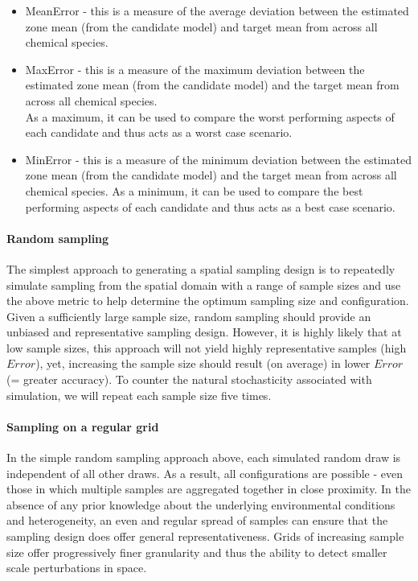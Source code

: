 \documentclass[a4paper]{article}
\begin{document}
\begin{itemize}
\tightlist
\item
  MeanError - this is a measure of the average deviation between the
  estimated zone mean (from the candidate model) and target mean from
  across all chemical species.
\item
  MaxError - this is a measure of the maximum deviation between the
  estimated zone mean (from the candidate model) and the target mean
  from across all chemical species.\\
  As a maximum, it can be used to compare the worst performing aspects
  of each candidate and thus acts as a worst case scenario.
\item
  MinError - this is a measure of the minimum deviation between the
  estimated zone mean (from the candidate model) and the target mean
  from across all chemical species. As a minimum, it can be used to
  compare the best performing aspects of each candidate and thus acts as
  a best case scenario.
\end{itemize}

\hypertarget{random-sampling}{%
\paragraph{Random sampling}\label{random-sampling}}

The simplest approach to generating a spatial sampling design is to
repeatedly simulate sampling from the spatial domain with a range of
sample sizes and use the above metric to help determine the optimum
sampling size and configuration. Given a sufficiently large sample size,
random sampling should provide an unbiased and representative sampling
design. However, it is highly likely that at low sample sizes, this
approach will not yield highly representative samples (high \(Error\)),
yet, increasing the sample size should result (on average) in lower
\(Error\) (= greater accuracy). To counter the natural stochasticity
associated with simulation, we will repeat each sample size five times.

\hypertarget{sampling-on-a-regular-grid}{%
\paragraph{Sampling on a regular
grid}\label{sampling-on-a-regular-grid}}

In the simple random sampling approach above, each simulated random draw
is independent of all other draws. As a result, all configurations are
possible - even those in which multiple samples are aggregated together
in close proximity. In the absence of any prior knowledge about the
underlying environmental conditions and heterogeneity, an even and
regular spread of samples can ensure that the sampling design does offer
general representativeness. Grids of increasing sample size offer
progressively finer granularity and thus the ability to detect smaller
scale perturbations in space.
\end{document}
